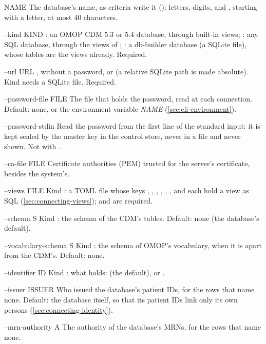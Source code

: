 \begin{params}
\item[NAME] The database's name, as criteria write it (): letters, digits,
  \code{-} and \code{\_}, starting with a letter, at most 40 characters.
\item[--kind KIND] : an OMOP CDM 5.3 or 5.4 database, through built-in views;
  : any SQL database, through the views of ; : a db-builder
  database (a SQLite file), whose tables are the views already. Required.
\item[--url URL] , without a password, or
   (a relative SQLite path is made absolute). Kind  needs a
  SQLite file. Required.
\item[--password-file FILE] The file that holds the password, read at each connection. Default:
  none, or the environment variable \textit{NAME}
  (\cref{sec:cli-environment}).
\item[--password-stdin] Read the password from the first line of the standard input: it is kept
  sealed by the master key in the control store, never in a file and never shown. Not with
  .
\item[--ca-file FILE] Certificate authorities (PEM) trusted for the server's certificate,
  besides the system's.
\item[--views FILE] Kind : a TOML file whose keys , ,
  , , , ,  and
   each hold a view as SQL (\cref{sec:connecting-views});  and
   are required.
\item[--schema S] Kind : the schema of the CDM's tables. Default: none (the database's
  default).
\item[--vocabulary-schema S] Kind : the schema of OMOP's vocabulary, when it is apart
  from the CDM's. Default: none.
\item[--identifier ID] Kind : what  holds: 
  (the default),  or .
\item[--issuer ISSUER] Who issued the database's patient IDs, for the rows that name none.
  Default: the database itself, so that its patient IDs link only its own persons
  (\cref{sec:connecting-identity}).
\item[--mrn-authority A] The authority of the database's MRNs, for the rows that name none.

\end{params}
